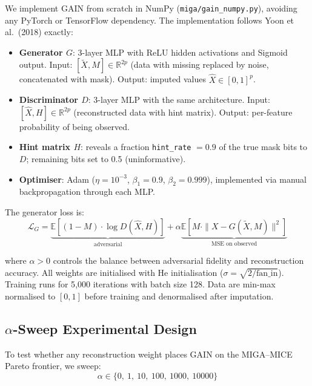 We implement GAIN from scratch in NumPy (\texttt{miga/gain\_numpy.py}), avoiding any PyTorch or TensorFlow dependency. The implementation follows Yoon et al.\ (2018) exactly:

\begin{itemize}
    \item \textbf{Generator $G$}: 3-layer MLP with ReLU hidden activations and Sigmoid output. Input: $[\tilde{X}, M] \in \mathbb{R}^{2p}$ (data with missing replaced by noise, concatenated with mask). Output: imputed values $\hat{X} \in [0,1]^p$.
    \item \textbf{Discriminator $D$}: 3-layer MLP with the same architecture. Input: $[\hat{X}, H] \in \mathbb{R}^{2p}$ (reconstructed data with hint matrix). Output: per-feature probability of being observed.
    \item \textbf{Hint matrix $H$}: reveals a fraction \texttt{hint\_rate} $= 0.9$ of the true mask bits to $D$; remaining bits set to 0.5 (uninformative).
    \item \textbf{Optimiser}: Adam ($\eta = 10^{-3}$, $\beta_1 = 0.9$, $\beta_2 = 0.999$), implemented via manual backpropagation through each MLP.
\end{itemize}

The generator loss is:
\begin{equation}
    \mathcal{L}_G = \underbrace{\mathbb{E}[(1-M)\cdot\log D(\hat{X}, H)]}_{\text{adversarial}} + \alpha\underbrace{\mathbb{E}[M \cdot \|X - G(\tilde{X}, M)\|^2]}_{\text{MSE on observed}}
\end{equation}

where $\alpha > 0$ controls the balance between adversarial fidelity and reconstruction accuracy. All weights are initialised with He initialisation ($\sigma = \sqrt{2/\text{fan\_in}}$). Training runs for 5{,}000 iterations with batch size 128. Data are min-max normalised to $[0,1]$ before training and denormalised after imputation.

\subsection{\texorpdfstring{$\alpha$}{α}-Sweep Experimental Design}

To test whether any reconstruction weight places GAIN on the MIGA--MICE Pareto frontier, we sweep:
\begin{equation}
    \alpha \in \{0,\ 1,\ 10,\ 100,\ 1000,\ 10000\}
\end{equation}

